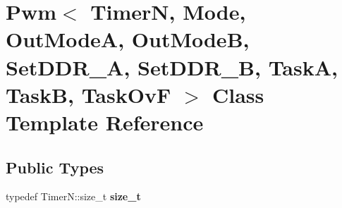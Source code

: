 \hypertarget{classPwm}{}\section{Pwm$<$ TimerN, Mode, Out\+ModeA, Out\+ModeB, Set\+D\+D\+R\+\_\+A, Set\+D\+D\+R\+\_\+B, TaskA, TaskB, Task\+OvF $>$ Class Template Reference}
\label{classPwm}
\subsection*{Public Types}
\begin{DoxyCompactItemize}
\item 
\hypertarget{classPwm_a085bea402ce3fe904e208f6c1c5e1fa3}{}\label{classPwm_a085bea402ce3fe904e208f6c1c5e1fa3} 
typedef Timer\+N\+::size\+\_\+t {\bfseries size\+\_\+t}
\end{DoxyCompactItemize}
